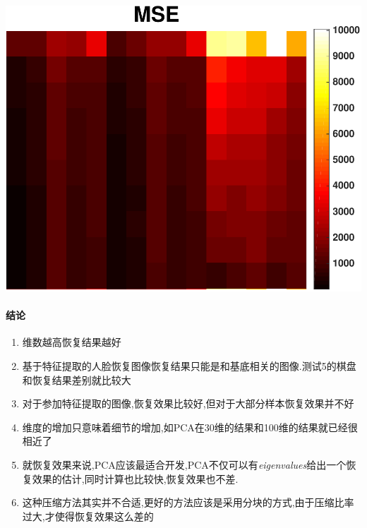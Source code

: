 \begin{center}
\begin{minipage}[t]{\linewidth}
\center
{
		\captionsetup{justification=centering}
\includegraphics[width=\textwidth]{Img/pni_rec_mse} 
\label{fig:ica_base}
}
\end{minipage}
\medskip
\end{center}

\paragraph{结论}
\begin{enumerate}
	\item 维数越高恢复结果越好
	\item 基于特征提取的人脸恢复图像恢复结果只能是和基底相关的图像.测试5的棋盘和恢复结果差别就比较大
	\item 对于参加特征提取的图像,恢复效果比较好,但对于大部分样本恢复效果并不好
	\item 维度的增加只意味着细节的增加,如PCA在30维的结果和100维的结果就已经很相近了
	\item 就恢复效果来说,PCA应该最适合开发,PCA不仅可以有\textit{eigenvalues}给出一个恢复效果的估计,同时计算也比较快,恢复效果也不差.
	\item 这种压缩方法其实并不合适,更好的方法应该是采用分块的方式,由于压缩比率过大,才使得恢复效果这么差的
\end{enumerate}


